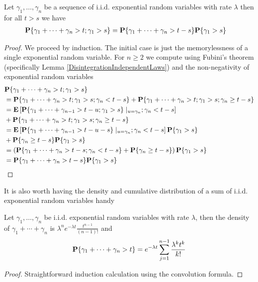 \begin{prop}\label{SumOfExponentialMemoryless}Let $\gamma_1, \dotsc, \gamma_n$ be a sequence of
  i.i.d. exponential random variables with rate $\lambda$ then for all
  $t > s$ we have
\begin{align*}
\textbf{P}\{\gamma_1 +\dotsb + \gamma_n > t; \gamma_1 > s\} &=
\textbf{P}\{\gamma_1 +\dotsb + \gamma_n > t-s\} \textbf{P}\{\gamma_1 > s\} 
\end{align*}
\end{prop}
\begin{proof}
We proceed by induction.  The initial case is just the memorylessness
of a single exponential random variable.  For $n \geq 2$ we compute using Fubini's theorem (specifically Lemma
\ref{DisintegrationIndependentLaws}) and the non-negativity of
exponential random variables
\begin{align*}
&\textbf{P}\{\gamma_1 + \dotsb + \gamma_n > t ; \gamma_1 > s\} \\
&= \textbf{P}\{\gamma_1 + \dotsb + \gamma_n > t ; \gamma_1 > s;
  \gamma_n < t-s\} + \textbf{P}\{\gamma_1 + \dotsb + \gamma_n > t ; \gamma_1 > s;
  \gamma_n \geq t-s\}  \\
&= \textbf{E}\left[\textbf{P}\{\gamma_1 + \dotsb + \gamma_{n-1} > t-u ;
    \gamma_1 > s\} \mid_{u = \gamma_n} ;
  \gamma_n < t-s\right] \\
&+ \textbf{P}\{\gamma_1 + \dotsb + \gamma_n > t ; \gamma_1 > s;
  \gamma_n \geq t-s\}  \\
&= \textbf{E}\left[\textbf{P}\{\gamma_1 + \dotsb + \gamma_{n-1} > t-u-s\}
  \mid_{u = \gamma_n} ; 
  \gamma_n < t-s\right] \textbf{P}\{\gamma_1 > s\} \\
&+ \textbf{P}\{\gamma_n \geq t-s\} \textbf{P}\{\gamma_1 > s\} \\
&= \left(\textbf{P}\{\gamma_1 + \dotsb + \gamma_{n} > t-s;  \gamma_n < t-s\}
+ \textbf{P}\{\gamma_n \geq t-s\} \right) \textbf{P}\{\gamma_1 > s\} \\
&= \textbf{P}\{\gamma_1 + \dotsb + \gamma_{n} > t-s\}\textbf{P}\{\gamma_1 > s\} 
\end{align*}
\end{proof}

It is also worth having the density and cumulative distribution of a
sum of i.i.d. exponential random variables handy
\begin{prop}Let $\gamma_1, \dotsc, \gamma_n$ be i.i.d. exponential
  random variables with rate $\lambda$, then the density of $\gamma_1
  + \dotsb + \gamma_n$ is $\lambda^n e^{-\lambda t}
  \frac{t^{n-1}}{(n-1)!}$ and 
\begin{align*}
\textbf{P}\{\gamma_1 + \dotsb + \gamma_n > t\} = e^{-\lambda t}
\sum_{j=1}^{n-1} \frac{\lambda^k t^k}{k!}
\end{align*}
\end{prop}
\begin{proof}
Straightforward induction calculation using the convolution formula.
\end{proof}

